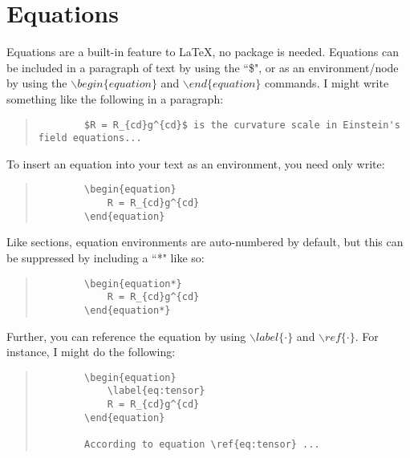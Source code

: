 \section{Equations}

Equations are a built-in feature to LaTeX, no package is needed. Equations can be included in a paragraph of text by using the ``\$", or as an environment/node by using the $\backslash begin\{equation\}$ and $\backslash end\{equation\}$ commands.  I might write something like the following in a paragraph:

\begin{quote}
	\begin{verbatim}
		$R = R_{cd}g^{cd}$ is the curvature scale in Einstein's field equations...
	\end{verbatim}
\end{quote}


To insert an equation into your text as an environment, you need only write:

\begin{quote}
	\begin{verbatim}
		\begin{equation}
			R = R_{cd}g^{cd}
		\end{equation}
	\end{verbatim}
\end{quote}

Like sections, equation environments are auto-numbered by default, but this can be suppressed by including a ``*" like so:

\begin{quote}
	\begin{verbatim}
		\begin{equation*}
			R = R_{cd}g^{cd}
		\end{equation*}
	\end{verbatim}
\end{quote}

Further, you can reference the equation by using $\backslash label\{\cdot\}$ and $\backslash ref\{\cdot\}$.  For instance, I might do the following:

\begin{quote}
	\begin{verbatim}
		\begin{equation}
			\label{eq:tensor}	
			R = R_{cd}g^{cd}
		\end{equation}
		
		According to equation \ref{eq:tensor} ...
	\end{verbatim}
\end{quote}

